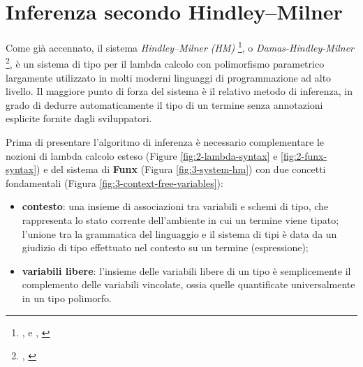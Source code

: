 \section{Inferenza secondo Hindley–Milner}
\label{sec:3-4-hm-type-inference}

Come già accennato, il sistema \textit{Hindley–Milner (HM)}%
\footnote{, \cite{PrincipalTypeSchemeObjectCombinatoryLogic}
    e , \cite{TheoryTypePolymorphismProgramming}},
o \textit{Damas-Hindley-Milner}%
\footnote{, \cite{PrincipalTypeSchemesFunctionalPrograms}},
è un sistema di tipo per il lambda calcolo con polimorfismo parametrico largamente utilizzato
in molti moderni linguaggi di programmazione ad alto livello. Il maggiore punto di forza del sistema
è il relativo metodo di inferenza, in grado di dedurre automaticamente il tipo di un termine
senza annotazioni esplicite fornite dagli sviluppatori.


Prima di presentare l'algoritmo di inferenza è necessario complementare le nozioni di lambda calcolo esteso
(Figure \ref{fig:2-lambda-syntax} e \ref{fig:2-funx-syntax}) e del sistema di \textbf{Funx} (Figura \ref{fig:3-system-hm})
con due concetti fondamentali (Figura \ref{fig:3-context-free-variables}):
\begin{itemize}
    \item \textbf{contesto}: una insieme di associazioni tra variabili e schemi di tipo,
          che rappresenta lo stato corrente dell'ambiente in cui un termine viene tipato; l'unione tra la grammatica
          del linguaggio e il sistema di tipi è data da un giudizio di tipo effettuato nel contesto su un termine (espressione);
    \item \textbf{variabili libere}: l'insieme delle variabili libere di un tipo è semplicemente il complemento
          delle variabili vincolate, ossia quelle quantificate universalmente in un tipo polimorfo.
\end{itemize}


